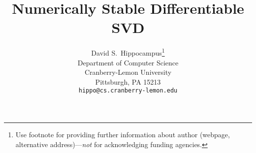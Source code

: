 \documentclass{article}
\title{Numerically Stable Differentiable SVD}
\author{%
  David S.~Hippocampus\thanks{Use footnote for providing further information
    about author (webpage, alternative address)---\emph{not} for acknowledging
    funding agencies.} \\
  Department of Computer Science\\
  Cranberry-Lemon University\\
  Pittsburgh, PA 15213 \\
  \texttt{hippo@cs.cranberry-lemon.edu} \\
}
\begin{document}
\maketitle







\small

\medskip
\small


\end{document}
